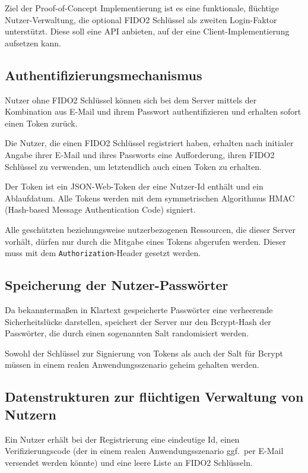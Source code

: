 \documentclass[journal]{IEEEtran}
\begin{document}
Ziel der Proof-of-Concept Implementierung ist es eine funktionale,
flüchtige Nutzer-Verwaltung, die optional FIDO2 Schlüssel als zweiten
Login-Faktor unterstützt. Diese soll eine API anbieten, auf der eine
Client-Implementierung aufsetzen kann.

\subsection{Authentifizierungsmechanismus}

Nutzer ohne FIDO2 Schlüssel können sich bei dem Server mittels der Kombination
aus E-Mail und ihrem Passwort authentifizieren und erhalten sofort einen Token
zurück.

Die Nutzer, die einen FIDO2 Schlüssel registriert haben, erhalten nach
initialer Angabe ihrer E-Mail und ihres Passworts eine Aufforderung, ihren
FIDO2 Schlüssel zu verwenden, um letztendlich auch einen Token zu erhalten.

Der Token ist ein JSON-Web-Token der eine Nutzer-Id enthält und ein
Ablaufdatum. Alle Tokens werden mit dem symmetrischen Algorithmus HMAC
(Hash-based Message Authentication Code) signiert.

Alle geschützten beziehungsweise nutzerbezogenen Ressourcen, die dieser Server
vorhält, dürfen nur durch die Mitgabe eines Tokens abgerufen werden. Dieser
muss mit dem \texttt{Authorization}-Header gesetzt werden.

\subsection{Speicherung der Nutzer-Passwörter}

Da bekanntermaßen in Klartext gespeicherte Passwörter eine verheerende
Sicherheitslücke darstellen, speichert der Server nur den Bcrypt-Hash der
Passwörter, die durch einen sogenannten Salt randomisiert werden.

Sowohl der Schlüssel zur Signierung von Tokens als auch der Salt für Bcrypt
müssen in einem realen Anwendungsszenario geheim gehalten werden.

\subsection{Datenstrukturen zur flüchtigen Verwaltung von Nutzern}

Ein Nutzer erhält bei der Registrierung eine eindeutige Id, einen
Verifizierungscode (der in einem realen Anwendungsszenario ggf.\ per E-Mail
versendet werden könnte) und eine leere Liste an FIDO2 Schlüsseln.
\end{document}
